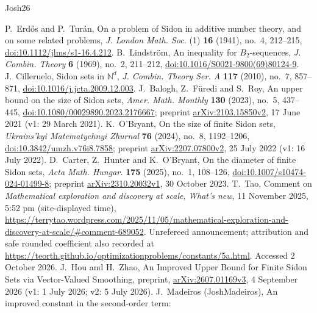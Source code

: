 \documentclass[10pt]{article}
\numberwithin{equation}{section}
\theoremstyle{remark}
\begin{document}
\begin{thebibliography}{Josh26}\footnotesize\raggedright\setlength{\itemsep}{0.5pt}
 P.~Erd\H{o}s and P.~Tur\'an, On a problem of Sidon in additive number theory, and on some related problems,
\emph{J. London Math. Soc.} (1) \textbf{16} (1941), no.~4, 212--215,
\href{https://doi.org/10.1112/jlms/s1-16.4.212}{doi:10.1112/jlms/s1-16.4.212}.
 B.~Lindstr\"om, An inequality for $B_2$-sequences,
\emph{J. Combin. Theory} \textbf{6} (1969), no.~2, 211--212,
\href{https://doi.org/10.1016/S0021-9800(69)80124-9}{doi:10.1016/S0021-9800(69)80124-9}.
 J.~Cilleruelo, Sidon sets in $\mathbb N^d$,
\emph{J. Combin. Theory Ser. A} \textbf{117} (2010), no.~7, 857--871,
\href{https://doi.org/10.1016/j.jcta.2009.12.003}{doi:10.1016/j.jcta.2009.12.003}.
 J.~Balogh, Z.~F\"uredi and S.~Roy, An upper bound on the size of Sidon sets,
\emph{Amer. Math. Monthly} \textbf{130} (2023), no.~5, 437--445,
\href{https://doi.org/10.1080/00029890.2023.2176667}{doi:10.1080/00029890.2023.2176667};
preprint \href{https://arxiv.org/abs/2103.15850v2}{arXiv:2103.15850v2},
17 June 2021 (v1: 29 March 2021).
 K.~O'Bryant, On the size of finite Sidon sets,
\emph{Ukrains'kyi Matematychnyi Zhurnal} \textbf{76} (2024), no.~8, 1192--1206,
\href{https://doi.org/10.3842/umzh.v76i8.7858}{doi:10.3842/umzh.v76i8.7858};
preprint \href{https://arxiv.org/abs/2207.07800v2}{arXiv:2207.07800v2},
25 July 2022 (v1: 16 July 2022).
 D.~Carter, Z.~Hunter and K.~O'Bryant, On the diameter of finite Sidon sets,
\emph{Acta Math. Hungar.} \textbf{175} (2025), no.~1, 108--126,
\href{https://doi.org/10.1007/s10474-024-01499-8}{doi:10.1007/s10474-024-01499-8};
preprint \href{https://arxiv.org/abs/2310.20032v1}{arXiv:2310.20032v1},
30 October 2023.
 T.~Tao, Comment on \emph{Mathematical exploration and discovery at scale},
\emph{What's new}, 11 November 2025, 5:52 pm (site-displayed time),
\url{https://terrytao.wordpress.com/2025/11/05/mathematical-exploration-and-discovery-at-scale/#comment-689052}.
Unrefereed announcement; attribution and safe rounded coefficient also recorded at
\url{https://teorth.github.io/optimizationproblems/constants/5a.html}.
Accessed 2 October 2026.
 J.~Hou and H.~Zhao, An Improved Upper Bound for Finite Sidon Sets via Vector-Valued Smoothing,
preprint, \href{https://arxiv.org/abs/2607.01169v3}{arXiv:2607.01169v3},
4 September 2026 (v1: 1 July 2026; v2: 5 July 2026).
 J.~Madeiros (JoshMadeiros), An improved constant in the second-order term:

\end{thebibliography}
\end{document}
